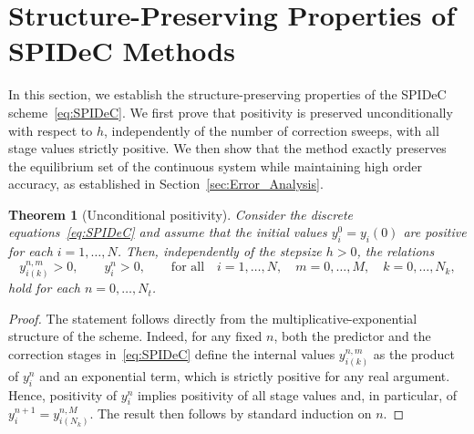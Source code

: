 \documentclass[a4paper,num-refs]{oup-contemporary-spidec}
\newtheorem{theorem}{Theorem}[section]
\begin{document}
\section{Structure-Preserving Properties of SPIDeC Methods}
\label{sec:StructurePreserving}
In this section, we establish the structure-preserving properties of the SPIDeC scheme~\eqref{eq:SPIDeC}. We first prove that positivity is preserved unconditionally with respect to $h$, independently of the number of correction sweeps, with all stage values strictly positive. We then show that the method exactly preserves the equilibrium set of the continuous system while maintaining high order accuracy, as established in Section~\ref{sec:Error_Analysis}. 
\begin{theorem}[Unconditional positivity]\label{thm:Positivity_Unc}
    Consider the discrete equations~\eqref{eq:SPIDeC} and assume that the
    initial values $y_i^0=y_i(0)$ are positive for each $i=1,\dots,N$.
    Then, independently of the stepsize $h>0$, the relations
    \begin{equation}\label{eq:Num_Positivity}
        y^{n,m}_{i(k)}>0, \qquad y_i^n>0, \qquad \text{for all} \quad i=1,\dots,N, \quad m=0,\dots,M, \quad k=0,\dots,N_k,
    \end{equation}
    hold for each $n=0,\dots,N_t$.
\end{theorem}
\begin{proof}
    The statement follows directly from the multiplicative-exponential structure of the scheme. Indeed, for any fixed $n$, both the predictor and the correction stages in~\eqref{eq:SPIDeC} define the internal values $y^{n,m}_{i(k)}$ as the product of $y_i^n$ and an exponential term, which is strictly positive for any real argument. Hence, positivity of $y_i^n$ implies positivity of all stage values and, in particular, of $y_i^{n+1}=y^{n,M}_{i(N_k)}$. The result then follows by standard induction on $n$.
\end{proof}
\end{document}
